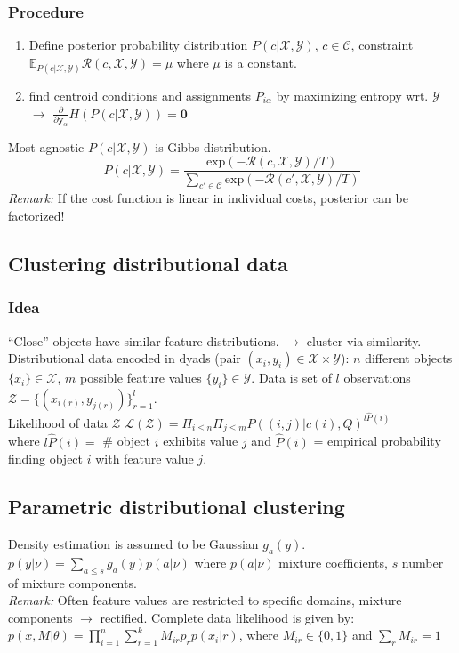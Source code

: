 \documentclass[9pt,parskip]{scrartcl}
\begin{document}
\begin{multicols*}{4}
\subsubsection*{Procedure}
\begin{enumerate}
	\item Define posterior probability distribution $P(c|\mathcal{X},\mathcal{Y})$, $c \in \mathcal{C}$, constraint $\mathbb{E}_{P(c|\mathcal{X},\mathcal{Y})} \mathcal{R}(c,\mathcal{X},\mathcal{Y}) = \mu$ where $\mu$ is a constant.
	\item find centroid conditions and assignments $P_{i \alpha}$ by maximizing entropy wrt. $\mathcal{Y}$ $\to$ $\frac{\partial }{\partial \mathbf{y}_{\alpha}} H(P(c|\mathcal{X},\mathcal{Y})) = \mathbf{0}$
\end{enumerate}
Most agnostic $P(c|\mathcal{X},\mathcal{Y})$ is Gibbs distribution.  \\

\[P(c|\mathcal{X},\mathcal{Y})=\frac{\text{exp}(-\mathcal{R}(c,\mathcal{X},\mathcal{Y})/T)}{\sum_{c' \in \mathcal{C}} \text{exp}(-\mathcal{R}(c',\mathcal{X},\mathcal{Y})/T)}\]
\textit{Remark:} If the cost function is linear in individual costs, posterior can be factorized!

\subsection*{Clustering distributional data}
\subsubsection*{Idea}
"`Close"' objects have similar feature distributions. $\to$ cluster via similarity. \\
Distributional data encoded in dyads (pair $(x_i, y_i) \in \mathcal{X} \times \mathcal{Y} $): $n$ different objects $\{x_i\} \in \mathcal{X}$, $m$ possible feature values $\{y_i\} \in \mathcal{Y}$. Data is set of $l$ observations $\mathcal{Z} = \{ (x_{i(r)}, y_{j(r)})\}_{r=1}^{l}$. \\
Likelihood of data $\mathcal{Z}$ $\mathcal{L}(\mathcal{Z}) = \Pi_{i \leq n} \Pi_{j \leq m} P((i,j)|c(i),Q)^{l\hat{P}(i)}$ \\
where $l\hat{P}(i) =$ \# object $i$ exhibits value $j$ and $\hat{P}(i) $ = empirical probability finding object $i$ with feature value $j$.

\subsection*{Parametric distributional clustering}
Density estimation is assumed to be Gaussian $g_a(y)$. \\
$p(y| \nu) = \sum_{a \leq s} g_a(y) p(a|\nu)$ where $p(a|\nu)$ mixture coefficients, $s$ number of mixture components.\\
\textit{Remark:} Often feature values are restricted to specific domains, mixture components $\to$ rectified.
Complete data likelihood is given by: $p(x,M|\theta) = \prod_{i=1}^n \sum_{r=1}^k M_{ir}p_rp(x_i|r)$, where $M_{ir} \in \{0,1\}$ and $\sum_r M_{ir} = 1$


\end{multicols*}
\end{document}
